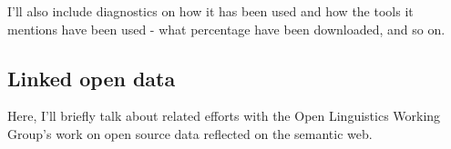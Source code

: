 I'll also include diagnostics on how it has been used and how the tools it mentions have been used - what percentage have been downloaded, and so on.

\subsection{Linked open data}
\label{subsec:lod}

Here, I'll briefly talk about related efforts with the Open Linguistics Working Group's \citep{chiarcos2012open} work on open source data reflected on the semantic web.\citep{chiarcos2013building}



%

